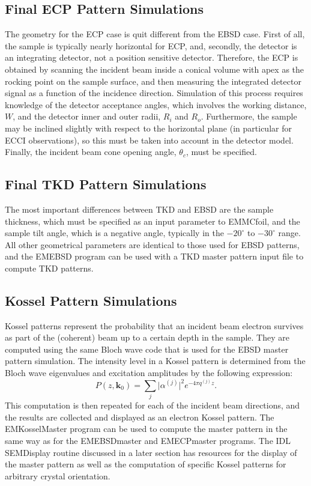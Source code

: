 \documentclass[DIV=calc, paper=letter, fontsize=11pt]{scrartcl}	 %
\begin{document}
\subsection{Final ECP Pattern Simulations \label{sec:ECP}}
The geometry for the ECP case is quit different from the EBSD case.  First of all, the sample is typically nearly horizontal for ECP,
and, secondly, the detector is an integrating detector, not a position sensitive detector.  Therefore, the ECP is obtained by scanning
the incident beam inside a conical volume with apex as the rocking point on the sample surface, and then measuring the integrated 
detector signal as a function of the incidence direction.  Simulation of this process requires knowledge of the detector acceptance 
angles, which involves the working distance, $W$, and the detector inner and outer radii, $R_i$ and $R_o$.  Furthermore, the sample may be inclined
slightly with respect to the horizontal plane (in particular for ECCI observations), so this must be taken into account in the detector model.
Finally, the incident beam cone opening angle, $\theta_c$, must be specified.  %

\subsection{Final TKD Pattern Simulations \label{sec:TKP}}
The most important differences between TKD and EBSD are the sample thickness, which must be specified as an input parameter to \textsf{EMMCfoil},
and the sample tilt angle, which is a negative angle, typically in the $-20^{\circ}$ to $-30^{\circ}$ range.  All other geometrical parameters
are identical to those used for EBSD patterns, and the \textsf{EMEBSD} program can be used with a TKD master pattern input file to compute TKD patterns.

\subsection{Kossel Pattern Simulations\label{sec:Kossel}}
Kossel patterns represent the probability that an incident beam electron survives as part of the (coherent) beam up to a certain depth in
the sample.  They are computed using the same Bloch wave code that is used for the EBSD master pattern simulation.  The intensity level in 
a Kossel pattern is determined from the Bloch wave eigenvalues and excitation amplitudes by the following expression:
\begin{equation}
	P(z,\mathbf{k}_0) = \sum_j \vert \alpha^{(j)}\vert^2 e^{-4\pi q^{(j)}z}.\label{eq:EKP}
\end{equation}
This computation is then repeated for each of the incident beam directions, and the results are collected and displayed as an 
electron Kossel pattern.  The \textsf{EMKosselMaster} program can be used to compute the master pattern in the same way as for
the \textsf{EMEBSDmaster} and \textsf{EMECPmaster} programs.  The IDL \textsf{SEMDisplay} routine discussed in a later section
has resources for the display of the master pattern as well as the computation of specific Kossel patterns for arbitrary 
crystal orientation.
\end{document}
